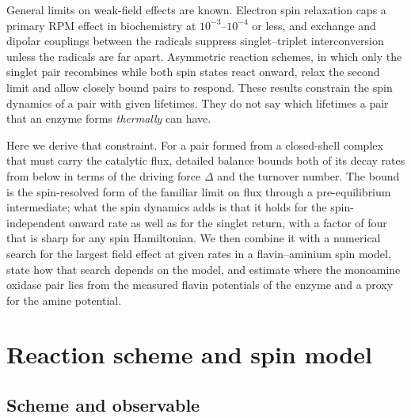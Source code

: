 \documentclass[journal=jpcbfk,manuscript=article,layout=traditional]{achemso}
\begin{document}
General limits on weak-field effects are known. Electron spin relaxation caps a
primary RPM effect in biochemistry at $10^{-3}$--$10^{-4}$ or
less,\cite{Binhi2025} and exchange and dipolar couplings between the radicals
suppress singlet--triplet interconversion unless the radicals are far
apart.\cite{Efimova2008} Asymmetric reaction schemes, in which only the singlet
pair recombines while both spin states react onward, relax the second limit and
allow closely bound pairs to respond.\cite{Denton2024} These results constrain
the spin dynamics of a pair with given lifetimes. They do not say which
lifetimes a pair that an enzyme forms \emph{thermally} can have.

Here we derive that constraint. For a pair formed from a closed-shell complex
that must carry the catalytic flux, detailed balance bounds both of its decay
rates from below in terms of the driving force $\Delta$ and the turnover number.
The bound is the spin-resolved form of the familiar limit on flux through a
pre-equilibrium intermediate; what the spin dynamics adds is that it holds for
the spin-independent onward rate as well as for the singlet return, with a
factor of four that is sharp for any spin Hamiltonian. We then combine it with
a numerical search for the largest field effect at given rates in a flavin--aminium
spin model, state how that search depends on the model, and estimate where the
monoamine oxidase pair lies from the measured flavin potentials of the enzyme and
a proxy for the amine potential.

\section{Reaction scheme and spin model}

\subsection{Scheme and observable}
\end{document}
